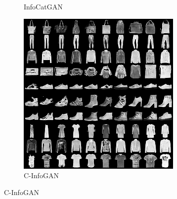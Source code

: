 \begin{figure}[hbtp]
\begin{subfigure}[b]{\trif\textwidth}
    \caption{InfoCatGAN}
  \end{subfigure}
  \begin{subfigure}[b]{\trif\textwidth}
    \includegraphics[width=\textwidth]{Img/fa-cig-new.png}
    \caption{C-InfoGAN}
  \end{subfigure}


\end{figure}
